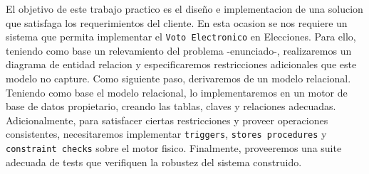 El objetivo de este trabajo practico es el diseño e implementacion de una solucion que satisfaga los requerimientos del cliente. En esta ocasion se nos requiere un sistema que permita implementar el \texttt{Voto Electronico} en Elecciones. Para ello, teniendo como base un relevamiento del problema -enunciado-, realizaremos un diagrama de entidad relacion y especificaremos restricciones adicionales que este modelo no capture. Como siguiente paso, derivaremos de un modelo relacional. Teniendo como base el modelo relacional, lo implementaremos en un motor de base de datos propietario, creando las tablas, claves y relaciones adecuadas. Adicionalmente, para satisfacer ciertas restricciones y proveer operaciones consistentes, necesitaremos implementar \texttt{triggers}, \texttt{stores procedures} y \texttt{constraint checks} sobre el motor fisico. Finalmente, proveeremos una suite adecuada de tests que verifiquen la robustez del sistema construido. 